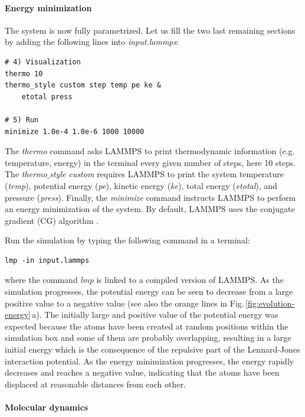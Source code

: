 \documentclass[9pt,tutorial]{livecoms}
\begin{document}
\paragraph{Energy minimization}
The system is now fully parametrized. Let us fill the two last remaining sections by adding the following lines into \textit{input.lammps}:
{\normalsize \begin{verbatim}
# 4) Visualization
thermo 10
thermo_style custom step temp pe ke &
    etotal press

# 5) Run
minimize 1.0e-4 1.0e-6 1000 10000
\end{verbatim}}
The \textit{thermo} command asks LAMMPS to print thermodynamic information (e.g. temperature, energy) in the terminal every given number of steps, here 10 steps. The \textit{thermo$\_$style custom} requires LAMMPS to print the system temperature (\textit{temp}), potential energy (\textit{pe}), kinetic energy (\textit{ke}), total energy (\textit{etotal}), and pressure (\textit{press}). Finally, the \textit{minimize} command instructs LAMMPS to perform an energy minimization of the system. By default, LAMMPS uses the conjugate gradient (CG) algorithm \cite{hestenes1952methods}.

Run the simulation by typing the following command in a terminal:
{\normalsize \begin{verbatim}
lmp -in input.lammps
\end{verbatim}}
where the command \textit{lmp} is linked to a compiled version of LAMMPS. As the simulation progresses, the potential energy can be seen to decrease from a large positive value to a negative value (see also the orange lines in Fig.\,\ref{fig:evolution-energy}\,a). The initially large and positive value of the potential energy was expected because the atoms have been created at random positions within the simulation box and some of them are probably overlapping, resulting in a large initial energy which is the consequence of the repulsive part of the Lennard-Jones interaction potential. As the energy minimization progresses, the energy rapidly decreases and reaches a negative value, indicating that the atoms have been displaced at reasonable distances from each other.

\paragraph{Molecular dynamics}
\end{document}
